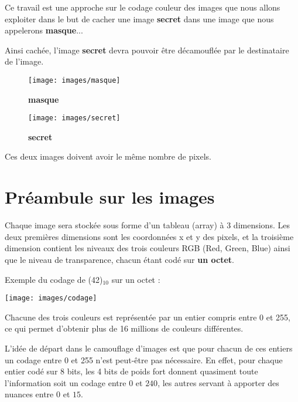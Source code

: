 \documentclass[10pt]{article}
\begin{document}
Ce travail est une approche sur le codage couleur des images que nous allons exploiter dans le but de cacher une image \textbf{secret} dans une image que nous appelerons \textbf{masque}...

Ainsi cachée, l'image \textbf{secret} devra pouvoir être décamouflée par le destinataire de l'image.


\begin{figure}[!h]
   \begin{minipage}[c]{.46\linewidth}
			\begin{center}
      \texttt{[image: images/masque]}
			\caption{\textbf{masque}\label{fig1}}
			\end{center}
   \end{minipage} \hfill
   \begin{minipage}[c]{.46\linewidth}
	\begin{center}
      \texttt{[image: images/secret]}
			\caption{\textbf{secret}\label{fig1}}
	\end{center}
   \end{minipage}
\end{figure}

Ces deux images doivent avoir le même nombre de pixels.

\section{Préambule sur les images}

Chaque image sera stockée sous forme d'un tableau (array) à 3 dimensions. Les deux premières dimensions sont les coordonnées x et y des pixels, et la troisième dimension contient les niveaux des trois couleurs RGB (Red, Green, Blue) ainsi que le niveau de transparence, chacun étant codé sur \textbf{un octet}.

Exemple du codage de (42)$_{10}$ sur un octet :
\begin{center}
\texttt{[image: images/codage]}
\end{center}

Chacune des trois couleurs est représentée par un entier compris entre 0 et 255, ce qui permet d'obtenir plus de 16 millions de couleurs différentes.

L’idée de départ dans le camouflage d'images est que pour chacun de ces entiers un codage entre 0 et 255 n’est peut-être pas nécessaire. En effet, pour chaque entier codé sur 8 bits, les 4 bits de poids fort donnent quasiment toute l’information soit un codage entre $0$ et $240$, les autres servant à apporter des nuances entre $0$ et $15$.
\end{document}
